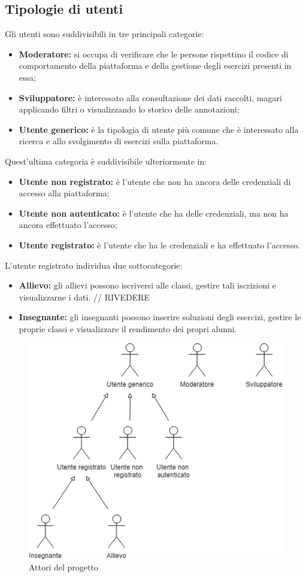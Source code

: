 \subsection{Tipologie di utenti}
Gli utenti sono suddivisibili in tre principali categorie: 
\begin{itemize}
	\item \textbf{Moderatore:} si occupa di verificare che le persone rispettino il codice di comportamento della piattaforma e della gestione degli esercizi presenti in essa;
	\item \textbf{Sviluppatore:} è interessato alla consultazione dei dati raccolti, magari applicando filtri o visualizzando lo storico delle annotazioni;
	\item \textbf{Utente generico:} è la tipologia di utente più comune che è interessato alla ricerca e allo svolgimento di esercizi sulla piattaforma.
\end{itemize}

Quest'ultima categoria è suddivisibile ulteriormente in:
\begin{itemize}
	\item \textbf{Utente non registrato:} è l'utente che non ha ancora delle credenziali di accesso alla piattaforma;
	\item \textbf{Utente non autenticato:} è l'utente che ha delle credenziali, ma non ha ancora effettuato l'accesso;
	\item \textbf{Utente registrato:} è l'utente che ha le credenziali e ha effettuato l'accesso.
\end{itemize}

L'utente registrato individua due sottocategorie:
\begin{itemize}
	\item \textbf{Allievo:} gli allievi possono iscriversi alle classi, gestire tali iscrizioni e visualizzarne i dati. // RIVEDERE
	\item \textbf{Insegnante:} gli insegnanti possono inserire soluzioni degli esercizi, gestire le proprie classi e visualizzare il rendimento dei propri alunni.
\end{itemize}
\begin{figure}[h]
			\centering
			\includegraphics[scale=0.7]{images/attori.png}
			\caption{Attori del progetto}
		\end{figure}